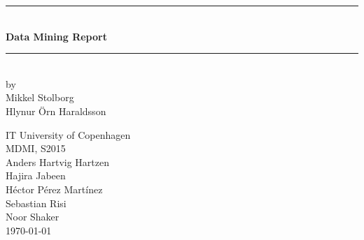 \documentclass[a4paper,11pt]{article}
\begin{document}
\begin{titlepage}

\centering \parindent=0pt
\newcommand{\HRule}{\rule{\textwidth}{1mm}}
 \HRule\\[1cm]\Huge\bfseries
Data Mining Report\\[0.7cm]
\HRule\\[4cm]  
\large by 
\\ Mikkel Stolborg
\\ Hlynur Örn Haraldsson
 \normalsize %
\begin{flushleft}
IT University of Copenhagen \\
MDMI, S2015\\
Anders Hartvig Hartzen\\
Hajira Jabeen\\
Héctor Pérez Martínez\\
Sebastian Risi\\
Noor Shaker\\
\today 
\end{flushleft}
\end{titlepage}

\tableofcontents
\pagebreak



\end{document}
